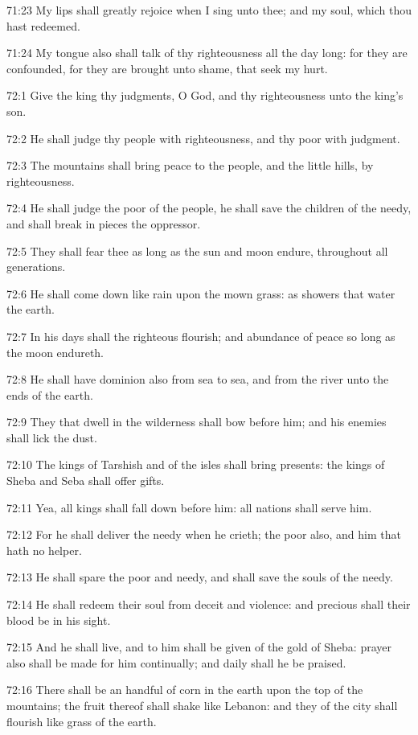 71:23 My lips shall greatly rejoice when I sing unto thee; and my soul, which thou hast redeemed.

71:24 My tongue also shall talk of thy righteousness all the day long: for they are confounded, for they are brought unto shame, that seek my hurt.



72:1 Give the king thy judgments, O God, and thy righteousness unto the king's son.

72:2 He shall judge thy people with righteousness, and thy poor with judgment.

72:3 The mountains shall bring peace to the people, and the little hills, by righteousness.

72:4 He shall judge the poor of the people, he shall save the children of the needy, and shall break in pieces the oppressor.

72:5 They shall fear thee as long as the sun and moon endure, throughout all generations.

72:6 He shall come down like rain upon the mown grass: as showers that water the earth.

72:7 In his days shall the righteous flourish; and abundance of peace so long as the moon endureth.

72:8 He shall have dominion also from sea to sea, and from the river unto the ends of the earth.

72:9 They that dwell in the wilderness shall bow before him; and his enemies shall lick the dust.

72:10 The kings of Tarshish and of the isles shall bring presents: the kings of Sheba and Seba shall offer gifts.

72:11 Yea, all kings shall fall down before him: all nations shall serve him.

72:12 For he shall deliver the needy when he crieth; the poor also, and him that hath no helper.

72:13 He shall spare the poor and needy, and shall save the souls of the needy.

72:14 He shall redeem their soul from deceit and violence: and precious shall their blood be in his sight.

72:15 And he shall live, and to him shall be given of the gold of Sheba: prayer also shall be made for him continually; and daily shall he be praised.

72:16 There shall be an handful of corn in the earth upon the top of the mountains; the fruit thereof shall shake like Lebanon: and they of the city shall flourish like grass of the earth.

